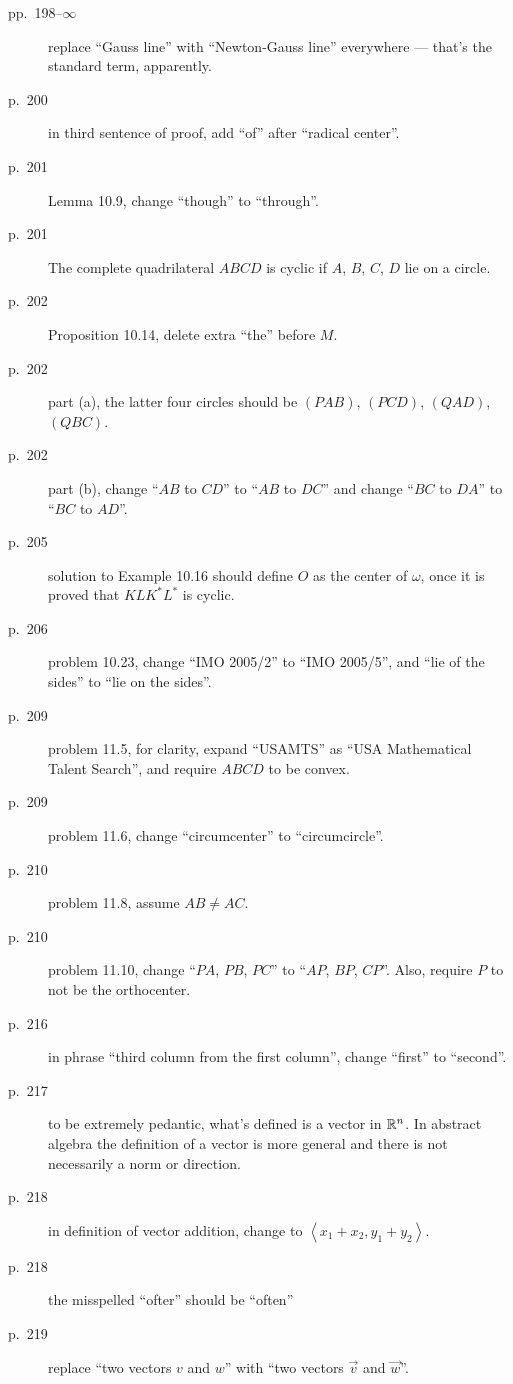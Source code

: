 \documentclass[11pt]{scrartcl}
\begin{document}
\begin{description}
\item[pp.\  198--$\infty$] replace ``Gauss line'' with ``Newton-Gauss line''
  everywhere --- that's the standard term, apparently.
\item[p.\  200] in third sentence of proof, add ``of'' after ``radical center''.
\item[p.\  201] Lemma 10.9, change ``though'' to ``through''.
\item[p.\  201] The complete quadrilateral $ABCD$ is cyclic if $A$, $B$, $C$, $D$ lie on a circle.
\item[p.\  202] Proposition 10.14, delete extra ``the'' before $M$.
\item[p.\  202] part (a), the latter four circles should be
  $(PAB)$, $(PCD)$, $(QAD)$, $(QBC)$.
\item[p.\  202] part (b), change ``$AB$ to $CD$'' to ``$AB$ to $DC$''
  and change ``$BC$ to $DA$'' to ``$BC$ to $AD$''.
\item[p.\  205] solution to Example 10.16 should define $O$ as the center of $\omega$,
  once it is proved that $KL K^\ast L^\ast$ is cyclic.
\item[p.\  206] problem 10.23, change ``IMO 2005/2'' to ``IMO 2005/5'',
  and ``lie of the sides'' to ``lie on the sides''.
\item[p.\  209] problem 11.5, for clarity,
  expand ``USAMTS'' as ``USA Mathematical Talent Search'',
  and require $ABCD$ to be convex.
\item[p.\  209] problem 11.6, change ``circumcenter'' to ``circumcircle''.
\item[p.\  210] problem 11.8, assume $AB \neq AC$.
\item[p.\  210] problem 11.10, change ``$PA$, $PB$, $PC$'' to ``$AP$, $BP$, $CP$''.
  Also, require $P$ to not be the orthocenter.
\item[p.\  216] in phrase ``third column from the first column'',
  change ``first'' to ``second''.
\item[p.\  217] to be extremely pedantic, what's defined is a vector in $\mathbb R^n$.
  In abstract algebra the definition of a vector is more general
  and there is not necessarily a norm or direction.
\item[p.\  218] in definition of vector addition,
  change to $\left\langle x_1+x_2, y_1+y_2 \right\rangle$.
\item[p.\  218] the misspelled ``ofter'' should be ``often''
\item[p.\  219] replace ``two vectors $v$ and $w$'' with ``two vectors $\vec v$ and $\vec w$''.

\end{description}
\end{document}
